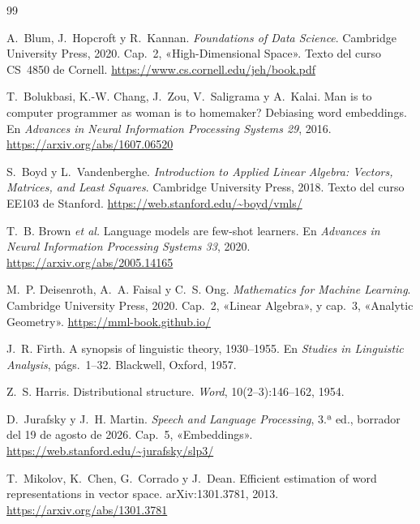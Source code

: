 \begin{thebibliography}{99}
\small

A.~Blum, J.~Hopcroft y R.~Kannan.
\newblock \emph{Foundations of Data Science}.
\newblock Cambridge University Press, 2020.
\newblock Cap.~2, «High-Dimensional Space». Texto del curso CS~4850 de Cornell.
\newblock \url{https://www.cs.cornell.edu/jeh/book.pdf}

T.~Bolukbasi, K.-W. Chang, J.~Zou, V.~Saligrama y A.~Kalai.
\newblock Man is to computer programmer as woman is to homemaker? Debiasing word embeddings.
\newblock En \emph{Advances in Neural Information Processing Systems 29}, 2016.
\newblock \url{https://arxiv.org/abs/1607.06520}

S.~Boyd y L.~Vandenberghe.
\newblock \emph{Introduction to Applied Linear Algebra: Vectors, Matrices, and Least Squares}.
\newblock Cambridge University Press, 2018.
\newblock Texto del curso EE103 de Stanford.
\newblock \url{https://web.stanford.edu/~boyd/vmls/}

T.~B. Brown \emph{et al.}
\newblock Language models are few-shot learners.
\newblock En \emph{Advances in Neural Information Processing Systems 33}, 2020.
\newblock \url{https://arxiv.org/abs/2005.14165}

M.~P. Deisenroth, A.~A. Faisal y C.~S. Ong.
\newblock \emph{Mathematics for Machine Learning}.
\newblock Cambridge University Press, 2020.
\newblock Cap.~2, «Linear Algebra», y cap.~3, «Analytic Geometry».
\newblock \url{https://mml-book.github.io/}

J.~R. Firth.
\newblock A synopsis of linguistic theory, 1930--1955.
\newblock En \emph{Studies in Linguistic Analysis}, págs.~1--32. Blackwell, Oxford, 1957.

Z.~S. Harris.
\newblock Distributional structure.
\newblock \emph{Word}, 10(2--3):146--162, 1954.

D.~Jurafsky y J.~H. Martin.
\newblock \emph{Speech and Language Processing}, 3.ª ed., borrador del 19 de agosto de 2026.
\newblock Cap.~5, «Embeddings».
\newblock \url{https://web.stanford.edu/~jurafsky/slp3/}

T.~Mikolov, K.~Chen, G.~Corrado y J.~Dean.
\newblock Efficient estimation of word representations in vector space.
\newblock arXiv:1301.3781, 2013.
\newblock \url{https://arxiv.org/abs/1301.3781}


\end{thebibliography}
